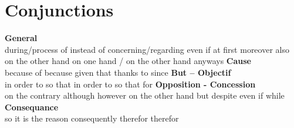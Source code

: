 \section{Conjunctions}
  {\sffamily\bfseries General}\\
     {during/process of}
     {instead of}
     {concerning/regarding}
     {even if}
     {at first}
    {moreover}
     {also}
     {on the other hand}
     {on one hand / on the other hand}
     {anyways}
{\sffamily\bfseries Cause}\\
   {because of}
   {because}
   {given that}
   {thanks to}
   {since}
{\sffamily\bfseries But -- Objectif}\\
   {in order to}
   {so that}
   {in order to}
   {so that}
   {for}
{\sffamily\bfseries Opposition - Concession}\\
   {on the contrary}
   {although}
   {however}
   {on the other hand}
   {but}
   {despite}
   {even if}
   {while}
{\sffamily\bfseries Consequance}\\
   {so}
   {it is the reason}
   {}
   {consequently}
   {therefor}
   {therefor}

